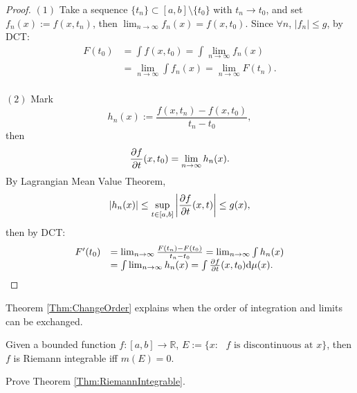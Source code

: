 \begin{proof}
    $(1)$ Take a sequence $\{t_{n}\}\subset[a,b]\setminus\{t_0\}$ 
    with $t_{n}\rightarrow t_0$, and set $f_{n}(x):=f(x,t_{n})$, 
    then $\lim_{n\rightarrow\infty}f_{n}(x)=f(x,t_{0})$. 
    Since $\forall n$, $|f_{n}|\le g$, by DCT:
    \begin{displaymath}
        \begin{array}{rl}
        F(t_0)
        &=\int f(x,t_{0})=\int\lim_{n\rightarrow\infty}f_{n}(x)\\
        &=\lim_{n\rightarrow\infty}\int f_{n}(x)
        =\lim_{n\rightarrow\infty}F(t_{n}).\\
        \end{array}
    \end{displaymath}

    $(2)$ Mark 
    \begin{displaymath}
        h_{n}(x):=\frac{f(x,t_n)-f(x,t_0)}{t_n-t_0},
    \end{displaymath}
    then 
    \begin{displaymath}
        \frac{\partial f}{\partial t}(x,t_0)=\lim_{n\rightarrow\infty}h_{n}(x).
    \end{displaymath}
    By Lagrangian Mean Value Theorem, 
    \begin{displaymath}
        |h_{n}(x)|\le\sup_{t\in[a,b]}
        \left|\frac{\partial f}{\partial t}(x,t)\right|\le g(x),
    \end{displaymath}
    then by DCT: 
    \begin{displaymath}
        \begin{array}{rl}
        F'(t_0)&=\lim_{n\rightarrow\infty}\frac{F(t_n)-F(t_0)}{t_n-t_0}
        =\lim_{n\rightarrow\infty}\int h_n(x)\\
        &=\int\lim_{n\rightarrow\infty}h_{n}(x)
        =\int\frac{\partial f}{\partial t}(x,t_0)\mathrm{d}\mu(x).
        \end{array}
    \end{displaymath}
\end{proof}
\begin{rem}
    Theorem \ref{Thm:ChangeOrder} 
    explains when the order of integration and limits can be exchanged.
\end{rem}
\begin{thm}
    \label{Thm:RiemannIntegrable}
    Given a bounded function $f:[a,b]\rightarrow\mathbb{R}$, 
    $E:=\{x:\text{ }f\text{ is discontinuous at }x\}$,
    then $f$ is Riemann integrable iff $m(E)=0$. 
\end{thm}
\begin{exc}
    Prove Theorem \ref{Thm:RiemannIntegrable}.
\end{exc}

